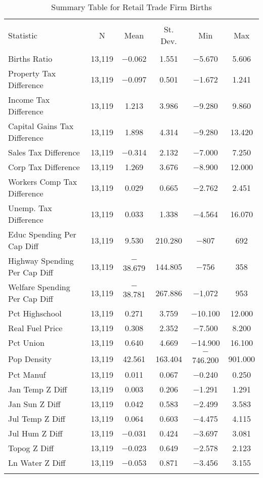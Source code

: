 
\begin{table}[!htbp] \centering 
  \caption{Summary Table for  Retail Trade Firm Births} 
  \label{44-45summary} 
\begin{tabular}{@{\extracolsep{5pt}}lccccc} 
\\[-1.8ex]\hline 
\hline \\[-1.8ex] 
Statistic & \multicolumn{1}{c}{N} & \multicolumn{1}{c}{Mean} & \multicolumn{1}{c}{St. Dev.} & \multicolumn{1}{c}{Min} & \multicolumn{1}{c}{Max} \\ 
\hline \\[-1.8ex] 
Births Ratio & 13,119 & $-$0.062 & 1.551 & $-$5.670 & 5.606 \\ 
Property Tax Difference & 13,119 & $-$0.097 & 0.501 & $-$1.672 & 1.241 \\ 
Income Tax Difference & 13,119 & 1.213 & 3.986 & $-$9.280 & 9.860 \\ 
Capital Gains Tax Difference & 13,119 & 1.898 & 4.314 & $-$9.280 & 13.420 \\ 
Sales Tax Difference & 13,119 & $-$0.314 & 2.132 & $-$7.000 & 7.250 \\ 
Corp Tax Difference & 13,119 & 1.269 & 3.676 & $-$8.900 & 12.000 \\ 
Workers Comp Tax Difference & 13,119 & 0.029 & 0.665 & $-$2.762 & 2.451 \\ 
Unemp. Tax Difference & 13,119 & 0.033 & 1.338 & $-$4.564 & 16.070 \\ 
Educ Spending Per Cap Diff & 13,119 & 9.530 & 210.280 & $-$807 & 692 \\ 
Highway Spending Per Cap Diff & 13,119 & $-$38.679 & 144.805 & $-$756 & 358 \\ 
Welfare Spending Per Cap Diff & 13,119 & $-$38.781 & 267.886 & $-$1,072 & 953 \\ 
Pct Highschool & 13,119 & 0.271 & 3.759 & $-$10.100 & 12.000 \\ 
Real Fuel Price & 13,119 & 0.308 & 2.352 & $-$7.500 & 8.200 \\ 
Pct Union & 13,119 & 0.640 & 4.669 & $-$14.900 & 16.100 \\ 
Pop Density & 13,119 & 42.561 & 163.404 & $-$746.200 & 901.000 \\ 
Pct Manuf & 13,119 & 0.011 & 0.067 & $-$0.240 & 0.250 \\ 
Jan Temp Z Diff & 13,119 & 0.003 & 0.206 & $-$1.291 & 1.291 \\ 
Jan Sun Z Diff & 13,119 & 0.042 & 0.583 & $-$2.499 & 3.583 \\ 
Jul Temp Z Diff & 13,119 & 0.064 & 0.603 & $-$4.475 & 4.115 \\ 
Jul Hum Z Diff & 13,119 & $-$0.031 & 0.424 & $-$3.697 & 3.081 \\ 
Topog Z Diff & 13,119 & $-$0.023 & 0.649 & $-$2.578 & 2.123 \\ 
Ln Water Z Diff & 13,119 & $-$0.053 & 0.871 & $-$3.456 & 3.155 \\ 
\hline \\[-1.8ex] 
\end{tabular} 
\end{table} 
